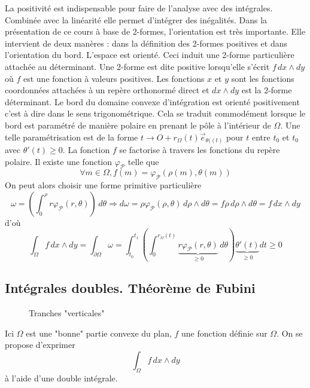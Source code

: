 La positivité est indispensable pour faire de l'analyse avec des intégrales. Combinée avec la linéarité elle permet d'intégrer des inégalités. Dans la présentation de ce cours à base de 2-formes, l'orientation est très importante. Elle intervient de deux manères : dans la définition des 2-formes positives et dans l'orientation du bord.\newline
L'espace est orienté. Ceci induit une 2-forme particulière attachée au déterminant. Une 2-forme est dite positive lorsqu'elle s'écrit $f\,dx\wedge dy$ où $f$ est une fonction à valeurs positives. Les fonctions $x$ et $y$ sont les fonctions coordonnées attachées à un repère orthonormé direct et $dx\wedge dy$ est la 2-forme déterminant.\newline
Le bord du domaine convexe d'intégration est orienté positivement c'est à dire dans le sens trigonométrique. Cela se traduit commodément lorsque le bord est paramétré de manière polaire en prenant le pôle à l'intérieur de $\Omega$. Une telle paramétrisation est de la forme
$t\rightarrow O+ r_{\Omega}(t)\overrightarrow{e}_{\theta((t)}$ pour $t$ entre $t_0$ et $t_0$ avec $\theta'(t)\geq 0$.\newline
La fonction $f$ se factorise à travers les fonctions du repère polaire. Il existe une fonction $\varphi_{\mathcal P}$ telle que 
\begin{displaymath}
 \forall m\in \Omega, f(m)= \varphi_{\mathcal P}(\rho(m),\theta(m))
\end{displaymath}
On peut alors choisir une forme primitive particulière
\begin{displaymath}
 \omega = \left(\int_0^\rho r \varphi_{\mathcal P}(r,\theta)  \right) \,d\theta
\Rightarrow
d\omega = \rho \varphi_{\mathcal P}(\rho,\theta) \,d\rho\wedge d\theta
=f\rho \,d\rho\wedge d\theta = f\,dx\wedge dy
\end{displaymath}
d'où
\begin{displaymath}
 \int_\Omega f\,dx\wedge dy =
\int_{\partial \Omega} \omega=
\int_{t_0}^{t_1}\left(\int_{0}^{r_{\Omega}(t)}
\underset{\geq 0}{\underbrace{r\varphi_{\mathcal P}(r,\theta)}}\,d\theta
 \right)
\underset{\geq 0}{\underbrace{\theta'(t)}}dt \geq 0 
\end{displaymath}


\subsection{Intégrales doubles. Théorème de Fubini}
\begin{figure}[h!t]
  \centering
  
  \caption{Tranches "verticales"}
  \label{fig:C2269_1}
\end{figure} 
Ici $\Omega$ est une "bonne" partie convexe du plan, $f$ une fonction définie sur $\Omega$. On se propose d'exprimer
\begin{displaymath}
 \int_\Omega f\,dx\wedge dy
\end{displaymath}
 à l'aide d'une double intégrale.

